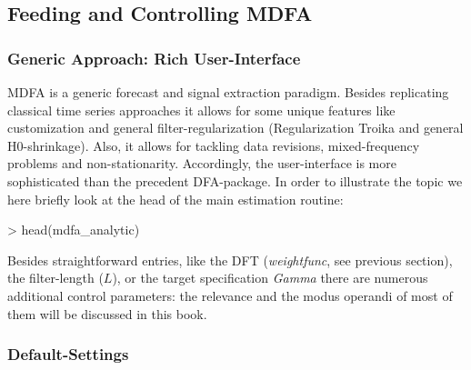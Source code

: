 \documentclass[a4paper]{book}
\begin{document}
\subsection{Feeding and Controlling MDFA}\label{control_dfa}

\subsubsection{Generic Approach: Rich User-Interface}

MDFA is a generic forecast and signal extraction paradigm. Besides replicating classical time series approaches it allows for some unique features like customization and  general filter-regularization (Regularization Troika and general H0-shrinkage). Also, it allows for tackling data revisions, mixed-frequency problems and non-stationarity. Accordingly, the user-interface is more sophisticated than the precedent DFA-package. In order to illustrate the topic we here briefly look at the head of the main estimation routine:    

\begin{Schunk}
\begin{Sinput}
> head(mdfa_analytic)
\end{Sinput}
\begin{Soutput}
1 function (L, lambda, weight_func, Lag, Gamma, eta, cutoff, i1,             
2     i2, weight_constraint, lambda_cross, lambda_decay, lambda_smooth,      
3     lin_eta, shift_constraint, grand_mean, b0_H0, c_eta, weight_structure, 
4     white_noise, synchronicity, lag_mat, troikaner)                        
5 {                                                                          
6     lambda <- abs(lambda)                                                  
\end{Soutput}
\end{Schunk}
Besides straightforward entries, like the DFT (\emph{weight\textunderscore func}, see previous section), the filter-length ($L$), or the target specification \emph{Gamma} there are numerous additional control parameters: the relevance and the modus operandi of most of them will be discussed in this book. 


\subsubsection{Default-Settings}
\end{document}
